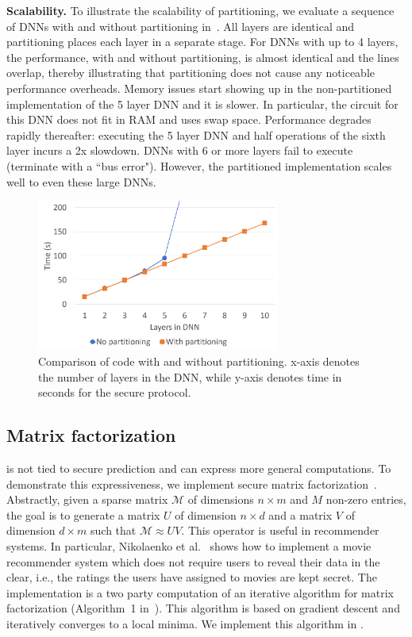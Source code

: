 \noindent\textbf{Scalability.}  To
illustrate the scalability of partitioning, we evaluate a
sequence of DNNs with and without partitioning in~.
All layers are identical and partitioning places each layer in a separate stage. 
For DNNs with up to 4  layers, the performance, with and without partitioning, is almost identical and the lines overlap, thereby
illustrating that partitioning does not cause any noticeable performance overheads.
Memory issues start showing up in the non-partitioned implementation of the 5 layer DNN and it is slower.
In particular, the circuit for this DNN does not fit in RAM and uses swap space.
Performance degrades rapidly thereafter: executing the 5 layer DNN and half operations of the sixth layer incurs a 2x slowdown.
DNNs with 6 or more layers fail to execute (terminate with a ``bus error").
However, the partitioned implementation scales well to even these large DNNs.

\begin{figure}
\includegraphics[width=8cm]{partitioning.png}
\caption{Comparison of \tool code with and without partitioning. x-axis denotes the number of layers in the DNN, while y-axis denotes time in seconds for the secure protocol.}
\label{fig:partitioning}
\end{figure}

\subsection{Matrix factorization}
\tool is not tied to secure prediction and can express more general computations.
To demonstrate this expressiveness, we  implement secure matrix factorization~\cite{valeriaMatrix}. Abstractly, given a sparse matrix $\mathcal{M}$ of dimensions
$n\times m$ and $M$ non-zero entries, the goal is to generate a matrix $U$ of dimension $n\times d$ and a matrix
$V$ of dimension $d\times m$ such that $\mathcal{M}\approx UV$. This operator is useful in recommender systems.
In particular, Nikolaenko et al.~\cite{valeriaMatrix} shows how to implement a movie recommender system which does not require users to reveal their data in the clear, i.e., the ratings the users have assigned to movies are kept secret. The implementation is a two party computation of an iterative algorithm for matrix factorization (Algorithm~1 in~\cite{valeriaMatrix}).
This algorithm is based on gradient descent and iteratively converges to a local minima.
We implement this algorithm in \tool.
  
